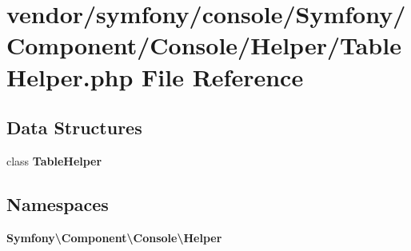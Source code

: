 \section{vendor/symfony/console/\+Symfony/\+Component/\+Console/\+Helper/\+Table\+Helper.php File Reference}
\label{_table_helper_8php}
\subsection*{Data Structures}
\begin{DoxyCompactItemize}
\item 
class {\bf Table\+Helper}
\end{DoxyCompactItemize}
\subsection*{Namespaces}
\begin{DoxyCompactItemize}
\item 
 {\bf Symfony\textbackslash{}\+Component\textbackslash{}\+Console\textbackslash{}\+Helper}
\end{DoxyCompactItemize}
